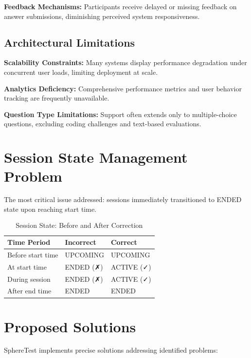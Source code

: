 \documentclass[12pt,a4paper]{report}
\newcommand{\rA}{\rowcolor{white}}
\newcommand{\rB}{\rowcolor{lightgray}}
\newcommand{\rH}{\rowcolor{headcol}}
\begin{document}
\textbf{Feedback Mechanisms:} Participants receive delayed or missing feedback on answer submissions, diminishing perceived system responsiveness.

\subsection{Architectural Limitations}

\textbf{Scalability Constraints:} Many systems display performance degradation under concurrent user loads, limiting deployment at scale.

\textbf{Analytics Deficiency:} Comprehensive performance metrics and user behavior tracking are frequently unavailable.

\textbf{Question Type Limitations:} Support often extends only to multiple-choice questions, excluding coding challenges and text-based evaluations.

\section{Session State Management Problem}

The most critical issue addressed: sessions immediately transitioned to ENDED state upon reaching start time.

\begin{table}[H]
  \centering
  \small
  \begin{tabular}{|l|l|l|}
    \hline
    \rH \textbf{Time Period} & \textbf{Incorrect} & \textbf{Correct} \\
    \hline
    \rA Before start time & UPCOMING & UPCOMING \\
    \hline
    \rB At start time & ENDED (✗) & ACTIVE (✓) \\
    \hline
    \rA During session & ENDED (✗) & ACTIVE (✓) \\
    \hline
    \rB After end time & ENDED & ENDED \\
    \hline
  \end{tabular}
  \caption{Session State: Before and After Correction}
\end{table}

\section{Proposed Solutions}

SphereTest implements precise solutions addressing identified problems:
\end{document}
